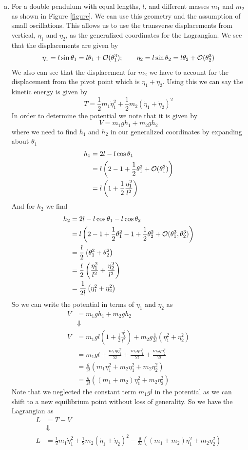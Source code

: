 \documentclass[11pt]{article}
\numberwithin{equation}{section}
\begin{document}
\begin{enumerate}[(a)]
\item For a double pendulum with equal lengths, $l$, and different masses $m_1$ and $m_2$ as
shown in Figure \ref{figure}. We can use this geometry and the assumption of small 
oscillations. This allows us to use the transverse displacements from vertical, $\eta_1$ and 
$\eta_2$, as the generalized coordinates for the Lagrangian. We see that the displacements 
are given by
$$\eta_1 = l\sin\theta_1= l\theta_1+\mathcal{O}(\theta_1^3);\qquad \eta_2=l\sin\theta_2= l\theta_2+\mathcal{O}(\theta_2^3)$$
We also can see that the displacement for $m_2$ we have to account for the displacement from
the pivot point which is $\eta_1+\eta_2$. Using this we can say the kinetic energy is given 
by
$$T = \frac{1}{2}m_1\dot{\eta}_1^2 + \frac{1}{2}m_2\left(\dot{\eta}_1+\dot{\eta}_2\right)^2$$
In order to determine the potential we note that it is given by
$$V = m_1gh_1+m_2gh_2$$
where we need to find $h_1$ and $h_2$ in our generalized coordinates by expanding about 
$\theta_1$
\begin{align*}
h_1 &= 2l-l\cos\theta_1\\
&= l\left(2-1+\frac{1}{2}\theta_1^2+\mathcal{O}(\theta_1^3)\right)\\
&= l\left(1+\frac{1}{2}\frac{\eta_1^2}{l^2}\right)
\end{align*}
And for $h_2$ we find
\begin{align*}
h_2 &= 2l-l\cos\theta_1-l\cos\theta_2\\
&= l\left(2-1+\frac{1}{2}\theta_1^2-1+\frac{1}{2}\theta_2^2+\mathcal{O}(\theta_1^3,\theta_2^3)\right)\\
&= \frac{l}{2}\left(\theta_1^2+\theta_2^2\right)\\
&= \frac{l}{2}\left(\frac{\eta_1^2}{l^2}+\frac{\eta_2^2}{l^2}\right)\\
&= \frac{1}{2l}\left(\eta_1^2+\eta_2^2\right)\\
\end{align*}
So we can write the potential in terms of $\eta_1$ and $\eta_2$ as
\begin{align*}
V &= m_1gh_1+m_2gh_2\\
&\Downarrow\\
V &= m_1gl\left(1+\frac{1}{2}\frac{\eta_1^2}{l^2}\right)+m_2g\frac{1}{2l}\left(\eta_1^2+\eta_2^2\right)\\
&= m_1gl + \frac{m_1g\eta_1^2}{2l} + \frac{m_2g\eta_1^2}{2l} + \frac{m_2g\eta_2^2}{2l}\\
&= \frac{g}{2l}\left(m_1\eta_1^2 + m_2\eta_1^2 + m_2\eta_2^2\right)\\
&= \frac{g}{2l}\left((m_1 + m_2)\eta_1^2 + m_2\eta_2^2\right)
\end{align*}
Note that we neglected the constant term $m_1gl$ in the potential as we can shift to a new
equilibrium point without loss of generality. So we have the Lagrangian as
\begin{align*}
L &= T - V\\
&\Downarrow\\
L &= \frac{1}{2}m_1\dot{\eta}_1^2 + \frac{1}{2}m_2\left(\dot{\eta}_1+\dot{\eta}_2\right)^2 - \frac{g}{2l}\left((m_1 + m_2)\eta_1^2 + m_2\eta_2^2\right)
\end{align*}


\end{enumerate}
\end{document}
